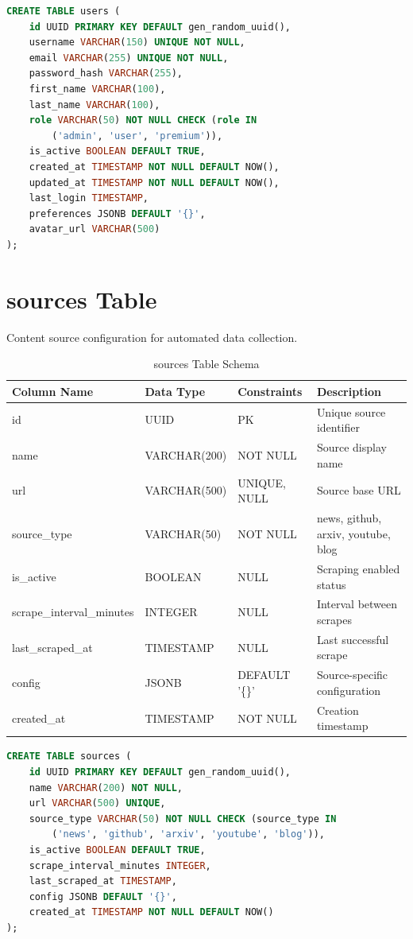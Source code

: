 \documentclass[12pt,a4paper]{report}
\begin{document}
\begin{lstlisting}[language=SQL,basicstyle=\ttfamily\small]
CREATE TABLE users (
    id UUID PRIMARY KEY DEFAULT gen_random_uuid(),
    username VARCHAR(150) UNIQUE NOT NULL,
    email VARCHAR(255) UNIQUE NOT NULL,
    password_hash VARCHAR(255),
    first_name VARCHAR(100),
    last_name VARCHAR(100),
    role VARCHAR(50) NOT NULL CHECK (role IN 
        ('admin', 'user', 'premium')),
    is_active BOOLEAN DEFAULT TRUE,
    created_at TIMESTAMP NOT NULL DEFAULT NOW(),
    updated_at TIMESTAMP NOT NULL DEFAULT NOW(),
    last_login TIMESTAMP,
    preferences JSONB DEFAULT '{}',
    avatar_url VARCHAR(500)
);
\end{lstlisting}

\newpage
\section{sources Table}

Content source configuration for automated data collection.

\begin{table}[h]
\centering
\small
\caption{sources Table Schema}
\begin{tabular}{|l|l|l|l|}
\toprule
\textbf{Column Name} & \textbf{Data Type} & \textbf{Constraints} & \textbf{Description} \\
\midrule
id & UUID & PK & Unique source identifier \\
name & VARCHAR(200) & NOT NULL & Source display name \\
url & VARCHAR(500) & UNIQUE, NULL & Source base URL \\
source\_type & VARCHAR(50) & NOT NULL & news, github, arxiv, youtube, blog \\
is\_active & BOOLEAN & NULL & Scraping enabled status \\
scrape\_interval\_minutes & INTEGER & NULL & Interval between scrapes \\
last\_scraped\_at & TIMESTAMP & NULL & Last successful scrape \\
config & JSONB & DEFAULT '\{\}' & Source-specific configuration \\
created\_at & TIMESTAMP & NOT NULL & Creation timestamp \\
\bottomrule
\end{tabular}
\end{table}

\begin{lstlisting}[language=SQL,basicstyle=\ttfamily\small]
CREATE TABLE sources (
    id UUID PRIMARY KEY DEFAULT gen_random_uuid(),
    name VARCHAR(200) NOT NULL,
    url VARCHAR(500) UNIQUE,
    source_type VARCHAR(50) NOT NULL CHECK (source_type IN 
        ('news', 'github', 'arxiv', 'youtube', 'blog')),
    is_active BOOLEAN DEFAULT TRUE,
    scrape_interval_minutes INTEGER,
    last_scraped_at TIMESTAMP,
    config JSONB DEFAULT '{}',
    created_at TIMESTAMP NOT NULL DEFAULT NOW()
);
\end{lstlisting}
\end{document}
